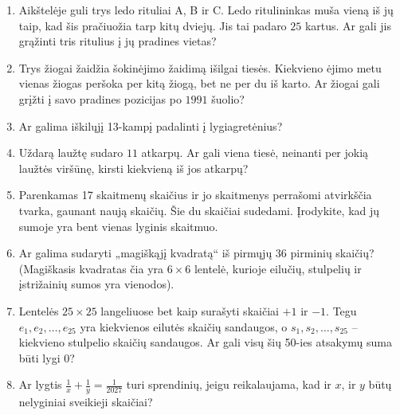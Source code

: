 \documentclass[11pt,a4paper]{scrartcl}
\begin{document}
\begin{enumerate}
    \item Aikštelėje guli trys ledo rituliai A, B ir C. Ledo ritulininkas muša vieną iš jų taip, kad šis pračiuožia tarp kitų dviejų. Jis tai padaro $25$ kartus. Ar gali jis grąžinti tris ritulius į jų pradines vietas?
    \item Trys žiogai žaidžia šokinėjimo žaidimą išilgai tiesės. Kiekvieno ėjimo metu vienas žiogas peršoka per kitą žiogą, bet ne per du iš karto. Ar žiogai gali grįžti į savo pradines pozicijas po $1991$ šuolio?
    \item Ar galima iškilųjį 13-kampį padalinti į lygiagretėnius?
    \item Uždarą laužtę sudaro $11$ atkarpų. Ar gali viena tiesė, neinanti per jokią laužtės viršūnę, kirsti kiekvieną iš jos atkarpų?
    \item Parenkamas 17 skaitmenų skaičius ir jo skaitmenys perrašomi atvirkščia tvarka, gaunant naują skaičių. Šie du skaičiai sudedami. Įrodykite, kad jų sumoje yra bent vienas lyginis skaitmuo.
    \item Ar galima sudaryti „magiškąjį kvadratą“ iš pirmųjų $36$ pirminių skaičių? (Magiškasis kvadratas čia yra $6 \times 6$ lentelė, kurioje eilučių, stulpelių ir įstrižainių sumos yra vienodos).
    \item Lentelės $25 \times 25$ langeliuose bet kaip surašyti skaičiai $+1$ ir $-1$. Tegu $e_1, e_2, \ldots, e_{25}$ yra kiekvienos eilutės skaičių sandaugos, o $s_1, s_2, \ldots, s_{25}$ – kiekvieno stulpelio skaičių sandaugos. Ar gali visų šių 50-ies atsakymų suma būti lygi $0$?
    \item Ar lygtis $\frac{1}{x} + \frac{1}{y} = \frac{1}{2027}$ turi sprendinių, jeigu reikalaujama, kad ir $x$, ir $y$ būtų nelyginiai sveikieji skaičiai?
\end{enumerate}
\end{document}
